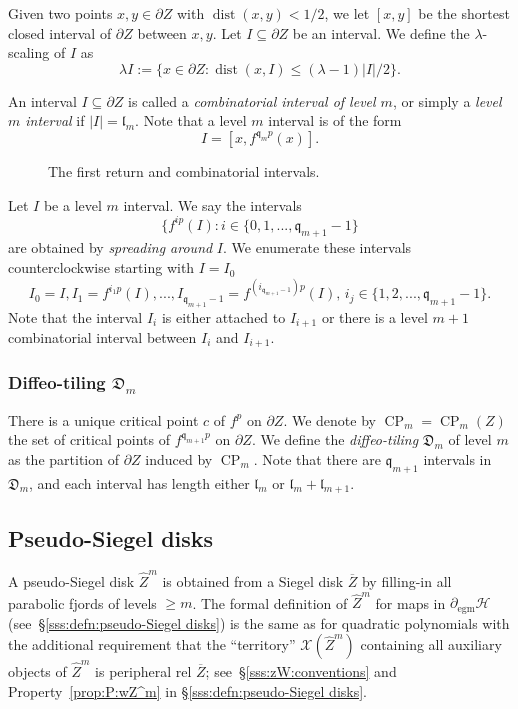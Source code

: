 \documentclass[11pt, reqno]{amsart}
\newcommand{\incfig}[1]{%
    \def\svgwidth{\columnwidth}
    {#1.pdf_tex}
}
\numberwithin{equation}{section}
\theoremstyle{plain}
\theoremstyle{theorem}
\theoremstyle{plain}
\theoremstyle{definition}
\DeclareMathOperator{\dist}{dist}
\DeclareMathOperator{\CP}{CP}
\numberwithin{figure}{section}
\newcommand\XX{\mathcal{X}}
\newcommand{\wZ}{{\widehat Z}}
\newcommand{\egm}{{\operatorname{egm}}}
\begin{document}
Given two points $x,y \in \partial Z$ with $\dist(x,y) < 1/2$, we let $[x,y]$ be the shortest closed interval of $\partial Z$ between $x, y$.
Let $I \subseteq \partial Z$ be an interval.
We define the $\lambda$-scaling of $I$ as
$$
\lambda I := \{x \in \partial Z: \dist(x, I) \leq (\lambda-1) \vert I \vert /2\}.
$$

An interval $I \subseteq \partial Z$ is called a {\em combinatorial interval of level $m$}, or simply a {\em level $m$ interval} if $\vert I \vert = \mathfrak{l}_m$.
Note that a level $m$ interval is of the form
$$
I = [x, f^{\mathfrak{q}_mp}(x)].
$$

\begin{figure}[ht]
  \centering
  \resizebox{0.8\linewidth}{!}{
  \incfig{CI}
  }
  \caption{The first return and combinatorial intervals.}
  \label{fig:CI}
\end{figure}

Let $I$ be a level $m$ interval.
We say the intervals
$$
\{f^{ip}(I): i \in \{0,1,..., \mathfrak{q}_{m+1}-1\} 
$$
are obtained by {\em spreading around} $I$.
We enumerate these intervals counterclockwise starting with $I = I_0$
$$
I_0 = I, I_1 = f^{i_1p}(I), ..., I_{\mathfrak{q}_{m+1} - 1} = f^{(i_{\mathfrak{q}_{m+1}-1})p}(I), \, i_j \in \{1,2, ..., \mathfrak{q}_{m+1} -1\}.
$$
Note that the interval $I_i$ is either attached to $I_{i+1}$ or there is a level $m+1$ combinatorial interval between $I_i$ and $I_{i+1}$.


\subsubsection{Diffeo-tiling $\mathfrak{D}_m$}\label{sss:diffeo tiling} There is a unique critical point $c$ of $f^p$ on $\partial Z$.
We denote by $\CP_m = \CP_m(Z)$ the set of critical points of $f^{\mathfrak{q}_{m+1}p}$ on $\partial Z$.
We define the {\em diffeo-tiling} $\mathfrak{D}_m$ of level $m$ as the partition of $\partial Z$ induced by $\CP_m$.
Note that there are $\mathfrak{q}_{m+1}$ intervals in $\mathfrak{D}_m$, and each interval has length either $\mathfrak{l}_m$ or $\mathfrak{l}_m + \mathfrak{l}_{m+1}$.


\subsection{Pseudo-Siegel disks}\label{subsec:psd} A pseudo-Siegel disk $\wZ^m$ is obtained from a Siegel disk $\overline Z$ by filling-in all parabolic fjords of levels $\ge m$. The formal definition of $\wZ^m$ for maps in $\partial _\egm \mathcal H$ (see~\S\ref{sss:defn:pseudo-Siegel disks}) is the same as for quadratic polynomials with the additional requirement that the ``territory'' $\XX(\wZ^m)$ containing all auxiliary objects of $\wZ^m$ is peripheral rel $\overline Z$; see~\S\ref{sss:zW:conventions} and Property~\ref{prop:P:wZ^m} in \S\ref{sss:defn:pseudo-Siegel disks}.
\end{document}
